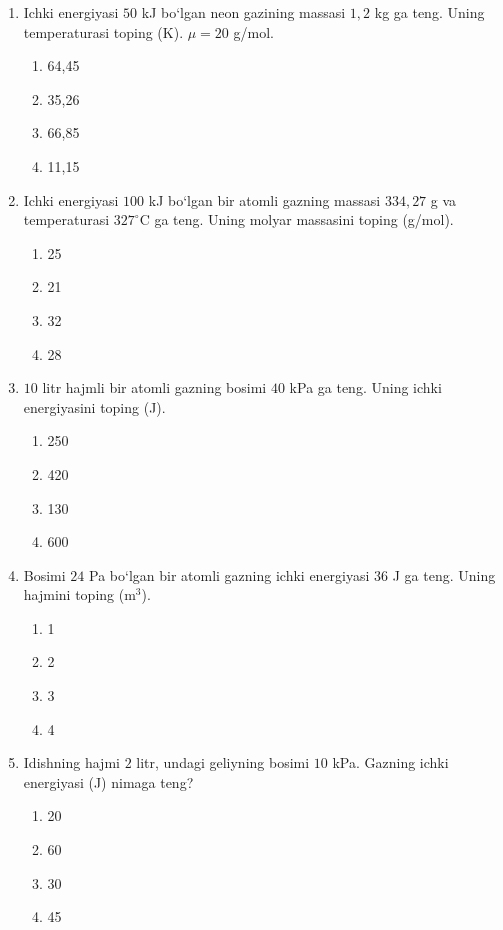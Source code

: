 \begin{enumerate}
\begin{enumerate}[label=\Alph*)]
\end{enumerate}

\item Ichki energiyasi $50$ kJ bo‘lgan neon gazining massasi $1,2$ kg ga teng. Uning temperaturasi toping (K). $\mu=20$ g/mol.
\begin{enumerate}[label=\Alph*)]
\item 64,45
\item 35,26
\item 66,85
\item 11,15

\end{enumerate}

\item Ichki energiyasi $100$ kJ bo‘lgan bir atomli gazning massasi $334,27$ g va temperaturasi $327^\circ$C ga teng. Uning molyar massasini toping (g/mol).
\begin{enumerate}[label=\Alph*)]
\item 25
\item 21
\item 32
\item 28

\end{enumerate}

\item $10$ litr hajmli bir atomli gazning bosimi $40$ kPa ga teng. Uning ichki energiyasini toping (J).
\begin{enumerate}[label=\Alph*)]
\item 250
\item 420
\item 130
\item 600

\end{enumerate}

\item Bosimi $24$ Pa bo‘lgan bir atomli gazning ichki energiyasi $36$ J ga teng. Uning hajmini toping (m$^3$).
\begin{enumerate}[label=\Alph*)]
\item 1
\item 2
\item 3
\item 4

\end{enumerate}

\item Idishning hajmi $2$ litr, undagi geliyning bosimi $10$ kPa. Gazning ichki energiyasi (J) nimaga teng?
\begin{enumerate}[label=\Alph*)]
\item 20
\item 60
\item 30
\item 45


\end{enumerate}
\end{enumerate}
